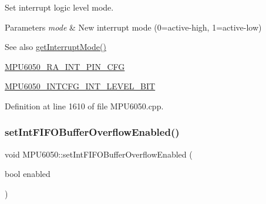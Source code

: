 Set interrupt logic level mode. 
\begin{DoxyParams}{Parameters}
{\em mode} & New interrupt mode (0=active-\/high, 1=active-\/low) \\
\hline
\end{DoxyParams}
\begin{DoxySeeAlso}{See also}
\mbox{\hyperlink{classMPU6050_a58da1dfb39eb34e3a09a9b0bf4d87f29}{get\+Interrupt\+Mode()}} 

\mbox{\hyperlink{MPU6050_8h_a82344e1daef2bac2e0d938319528be6c}{M\+P\+U6050\+\_\+\+R\+A\+\_\+\+I\+N\+T\+\_\+\+P\+I\+N\+\_\+\+C\+FG}} 

\mbox{\hyperlink{MPU6050_8h_a0ca358b8171fd08fd631434ee8ff2339}{M\+P\+U6050\+\_\+\+I\+N\+T\+C\+F\+G\+\_\+\+I\+N\+T\+\_\+\+L\+E\+V\+E\+L\+\_\+\+B\+IT}} 
\end{DoxySeeAlso}


Definition at line 1610 of file M\+P\+U6050.\+cpp.


\begin{DoxyCode}{0}

\end{DoxyCode}
\mbox{\label{classMPU6050_a83710a6b1e07f3b385239cc06f275cdb}} 
\subsubsection{\texorpdfstring{setIntFIFOBufferOverflowEnabled()}{setIntFIFOBufferOverflowEnabled()}}
{\footnotesize\ttfamily void M\+P\+U6050\+::set\+Int\+F\+I\+F\+O\+Buffer\+Overflow\+Enabled (\begin{DoxyParamCaption}\item[{bool}]{enabled }\end{DoxyParamCaption})}

